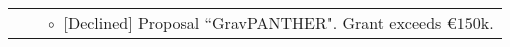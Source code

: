 \documentclass[11pt,letterpaper,sans]{moderncv}
\begin{document}
\begin{tabular}{rcl}
&\hspace{0.4cm} &{\color{color1} $\circ\;\;$}[Declined] Proposal ``GravPANTHER". Grant exceeds \euro$150$k.
\end{tabular} \\
\end{document}
